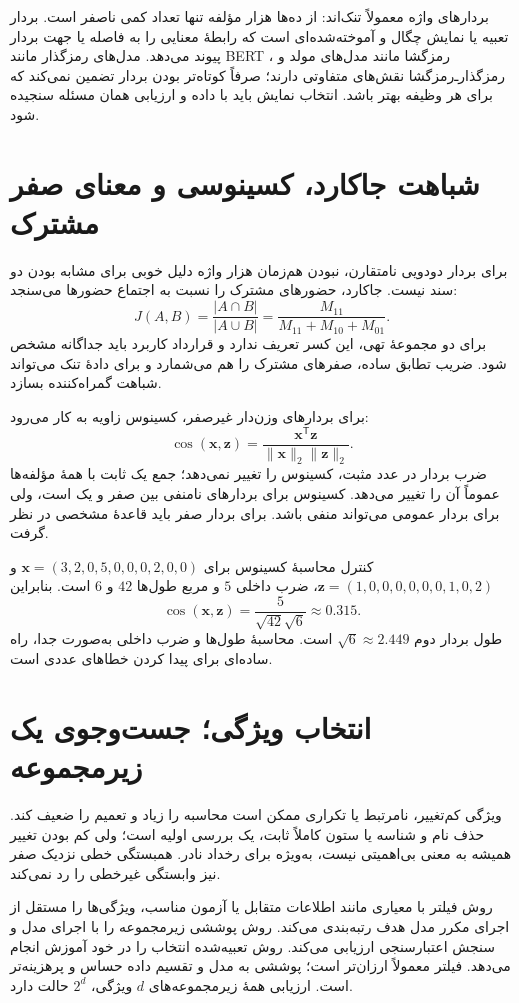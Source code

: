 بردارهای واژه معمولاً تنک‌اند: از ده‌ها هزار مؤلفه تنها تعداد کمی ناصفر است. بردار تعبیه یا  نمایش چگال و آموخته‌شده‌ای است که رابطهٔ معنایی را به فاصله یا جهت بردار پیوند می‌دهد. مدل‌های رمزگذار مانند BERT ، رمزگشا مانند مدل‌های مولد و رمزگذارـ‌رمزگشا نقش‌های متفاوتی دارند؛ صرفاً کوتاه‌تر بودن بردار تضمین نمی‌کند که برای هر وظیفه بهتر باشد. انتخاب نمایش باید با داده و ارزیابی همان مسئله سنجیده شود.

\section{شباهت جاکارد، کسینوسی و معنای صفر مشترک}
برای بردار دودویی نامتقارن، نبودن هم‌زمان هزار واژه دلیل خوبی برای مشابه بودن دو سند نیست. جاکارد، حضورهای مشترک را نسبت به اجتماع حضورها می‌سنجد:
\[J(A,B)=\frac{|A\cap B|}{|A\cup B|}=\frac{M_{11}}{M_{11}+M_{10}+M_{01}}.\]
برای دو مجموعهٔ تهی، این کسر تعریف ندارد و قرارداد کاربرد باید جداگانه مشخص شود. ضریب تطابق ساده، صفرهای مشترک را هم می‌شمارد و برای دادهٔ تنک می‌تواند شباهت گمراه‌کننده بسازد.

برای بردارهای وزن‌دار غیرصفر، کسینوس زاویه به کار می‌رود:
\[\operatorname{cos}(\mathbf x,\mathbf z)=\frac{\mathbf x^\mathsf T\mathbf z}{\|\mathbf x\|_2\|\mathbf z\|_2}.\]
ضرب بردار در عدد مثبت، کسینوس را تغییر نمی‌دهد؛ جمع یک ثابت با همهٔ مؤلفه‌ها عموماً آن را تغییر می‌دهد. کسینوس برای بردارهای نامنفی بین صفر و یک است، ولی برای بردار عمومی می‌تواند منفی باشد. برای بردار صفر باید قاعدهٔ مشخصی در نظر گرفت.

\begin{example}{کنترل محاسبهٔ کسینوس}
برای $\mathbf x=(3,2,0,5,0,0,0,2,0,0)$ و $\mathbf z=(1,0,0,0,0,0,0,1,0,2)$، ضرب داخلی $5$ و مربع طول‌ها $42$ و $6$ است. بنابراین
\[\operatorname{cos}(\mathbf x,\mathbf z)=\frac5{\sqrt{42}\sqrt6}\approx0.315.\]
طول بردار دوم $\sqrt6\approx2.449$ است. محاسبهٔ طول‌ها و ضرب داخلی به‌صورت جدا، راه ساده‌ای برای پیدا کردن خطاهای عددی است.
\end{example}

\section{انتخاب ویژگی؛ جست‌وجوی یک زیرمجموعه}
ویژگی کم‌تغییر، نامرتبط یا تکراری ممکن است محاسبه را زیاد و تعمیم را ضعیف کند. حذف نام و شناسه یا ستون کاملاً ثابت، یک بررسی اولیه است؛ ولی کم بودن تغییر همیشه به معنی بی‌اهمیتی نیست، به‌ویژه برای رخداد نادر. همبستگی خطی نزدیک صفر نیز وابستگی غیرخطی را رد نمی‌کند.

روش فیلتر  با معیاری مانند اطلاعات متقابل یا آزمون مناسب، ویژگی‌ها را مستقل از اجرای مکرر مدل هدف رتبه‌بندی می‌کند. روش پوششی  زیرمجموعه را با اجرای مدل و سنجش اعتبارسنجی ارزیابی می‌کند. روش تعبیه‌شده  انتخاب را در خود آموزش انجام می‌دهد. فیلتر معمولاً ارزان‌تر است؛ پوششی به مدل و تقسیم داده حساس و پرهزینه‌تر است. ارزیابی همهٔ زیرمجموعه‌های $d$ ویژگی، $2^d$ حالت دارد.


